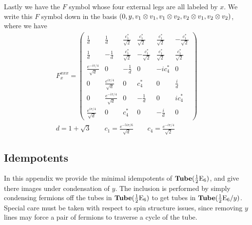 Lastly we have the $F$ symbol whose four external legs are all labeled by $x$.
We write this $F$ symbol down in the basis $(0,y, v_1\otimes v_1,v_1 \otimes v_2, v_2 \otimes v_1, v_2 \otimes v_2)$, where we have 
\begin{align}
F^{xxx}_x  = 
 \left(\begin{matrix}
\frac{1}{d} & \frac{1}{d} & \frac{c_1^*}{\sqrt{2}} & \frac{c_1^*}{\sqrt{2}} & \frac{c_1^*}{\sqrt{2}} & - \frac{c_1^*}{\sqrt{2}} \\
\frac{1}{d} & - \frac{1}{d} & \frac{c_1^*}{\sqrt{2}} & -\frac{c_1^*}{\sqrt{2}} & \frac{c_1^*}{\sqrt{2}} & \frac{c_1^*}{\sqrt{2}} \\
\frac{e^{- i \pi/4}}{\sqrt{d}} & 0 & -\frac{1}{d} & 0 & -i c_4^* & 0 \\
0 & \frac{e^{i \pi /4}}{\sqrt{d}} & 0 &c_4^* & 0 & \frac{ i}{d} \\
0 & \frac{e^{- i \pi /4}}{\sqrt{d}} & 0 & -\frac{1}{d} & 0 & i c_4^* \\ 
\frac{e^{i \pi /4}}{\sqrt{d}} & 0 & c_4^* & 0 & - \frac{i}{d} & 0
\end{matrix} \right) \\
d = 1 + \sqrt{3} \quad \quad c_1 = \frac{e^{-5 i \pi/6} }{\sqrt{d}} \quad \quad c_4 = \frac{e^{-i \pi/4}}{\sqrt{2}}
\end{align}


\subsection{Idempotents}
\label{IdempotentsHalfESix}


In this appendix we provide the minimal idempotents of $\textbf{Tube}(\frac{1}{2}\text{E}_6)$, and give there images under condensation of $y$.
The inclusion is performed by simply condensing fermions off the tubes in $\textbf{Tube}(\frac{1}{2}\text{E}_6)$ to get tubes in $\textbf{Tube}(\frac{1}{2}\text{E}_6 / y)$. 
Special care must be taken with respect to spin structure issues, 
since removing $y$ lines may force a pair of fermions to traverse a cycle of the tube. 


